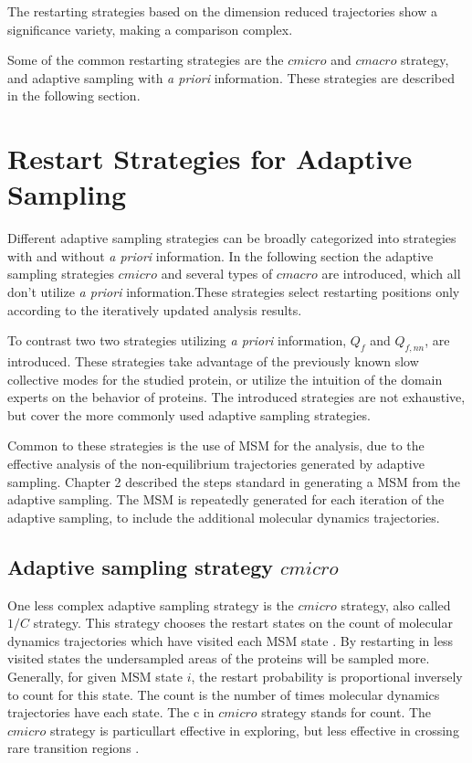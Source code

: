 The restarting strategies based on the dimension reduced trajectories show a significance variety, making a comparison complex.

Some of the common restarting strategies are the $cmicro$ and $cmacro$ strategy, and adaptive sampling with \emph{a priori} information. These strategies are described in the following section. 

\section{\label{sec:restart-strategies}Restart Strategies for Adaptive Sampling}


Different adaptive sampling strategies can be broadly categorized into strategies with and without \emph{a priori} information. In the following section the adaptive sampling strategies $cmicro$ and several types of $cmacro$ are introduced, which all don't utilize \emph{a priori} information.These strategies select restarting positions only according to the iteratively updated analysis results. 

To contrast two two strategies utilizing \emph{a priori} information, $Q_{f}$ and $Q_{f,nn}$, are introduced. These strategies take advantage of the previously known slow collective modes for the studied protein, or utilize the intuition of the domain experts on the behavior of proteins. The introduced strategies are not exhaustive, but cover the more commonly used adaptive sampling strategies. 

Common to these strategies is the use of MSM for the analysis, due to the effective analysis of the non-equilibrium trajectories generated by adaptive sampling. Chapter 2 described the steps standard in generating a MSM from the adaptive sampling. The MSM is repeatedly generated for each iteration of the adaptive sampling, to include the additional molecular dynamics trajectories. 

\subsection{Adaptive sampling strategy $cmicro$}
One less complex adaptive sampling strategy is the $cmicro$ strategy, also called $1/C$ strategy. This strategy chooses the restart
states on the count of molecular dynamics trajectories which have visited each MSM state \cite{weber2011characterization, Fabritiis-2014, AdaptivePELE-Lecina2017,doerr2016htmd}.
By restarting in less visited states the undersampled areas of the proteins will be sampled more. Generally, for given MSM state $i$, the restart probability is proportional inversely to count for this state. The count is the number of times molecular dynamics trajectories have each state. The c in $cmicro$ strategy stands for count. The $cmicro$ strategy is particullart effective in exploring, but less effective in crossing rare transition regions \cite{Adstrategies2018}.



